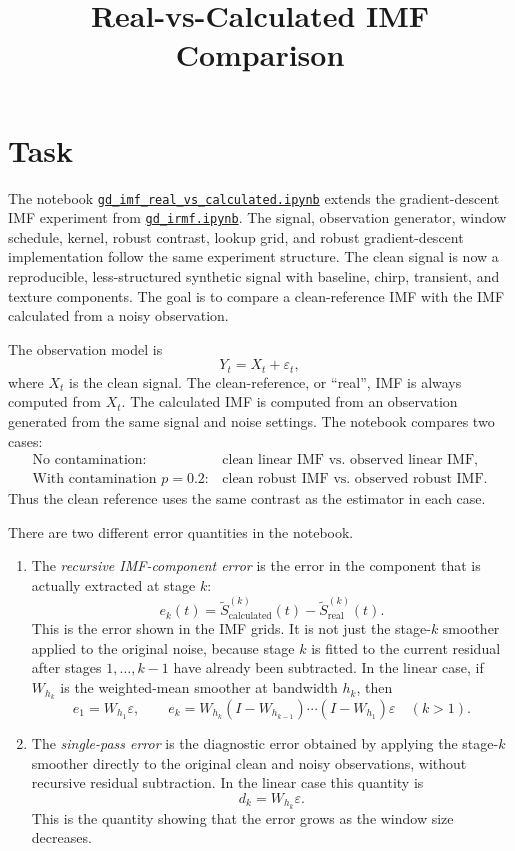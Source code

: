 \documentclass[11pt]{article}
\title{Real-vs-Calculated IMF Comparison}
\author{}
\date{}
\begin{document}
\maketitle

\section{Task}

The notebook
\href{https://github.com/mkuziuk/imf/blob/main/experiments/real-vs-calculated/gd_imf_real_vs_calculated.ipynb}{\texttt{gd\_imf\_real\_vs\_calculated.ipynb}}
extends the gradient-descent IMF experiment from
\href{https://github.com/mkuziuk/imf/blob/main/experiments/gd-irmf/gd_irmf.ipynb}{\texttt{gd\_irmf.ipynb}}. The signal, observation generator, window schedule,
kernel, robust contrast, lookup grid, and robust gradient-descent implementation
follow the same experiment structure. The clean signal is now a reproducible,
less-structured synthetic signal with baseline, chirp, transient, and texture
components. The goal is to compare a clean-reference IMF with the IMF calculated
from a noisy observation.

The observation model is
\[
Y_t = X_t + \varepsilon_t,
\]
where \(X_t\) is the clean signal. The clean-reference, or ``real'', IMF is always
computed from \(X_t\). The calculated IMF is computed from an observation generated
from the same signal and noise settings. The notebook compares two cases:
\[
\begin{array}{ll}
\text{No contamination:} & \text{clean linear IMF vs. observed linear IMF}, \\
\text{With contamination }p=0.2: & \text{clean robust IMF vs. observed robust IMF}.
\end{array}
\]
Thus the clean reference uses the same contrast as the estimator in each case.\newline

There are two different error quantities in the notebook.

\begin{enumerate}
\item The \emph{recursive IMF-component error} is the error in the component that
is actually extracted at stage \(k\):
\[
e_k(t)=\widetilde S^{(k)}_{\mathrm{calculated}}(t)
-\widetilde S^{(k)}_{\mathrm{real}}(t).
\]
This is the error shown in the IMF grids. It is not just the stage-\(k\) smoother
applied to the original noise, because stage \(k\) is fitted to the current
residual after stages \(1,\ldots,k-1\) have already been subtracted. In the linear
case, if \(W_{h_k}\) is the weighted-mean smoother at bandwidth \(h_k\), then
\[
e_1 = W_{h_1}\varepsilon,
\qquad
e_k =
W_{h_k}(I-W_{h_{k-1}})\cdots(I-W_{h_1})\varepsilon
\quad (k>1).
\]

\item The \emph{single-pass error} is the diagnostic error obtained by applying
the stage-\(k\) smoother directly to the original clean and noisy observations,
without recursive residual subtraction. In the linear case this quantity is
\[
d_k = W_{h_k}\varepsilon.
\]
This is the quantity showing that the error grows as the window size decreases.
\end{enumerate}
\end{document}
